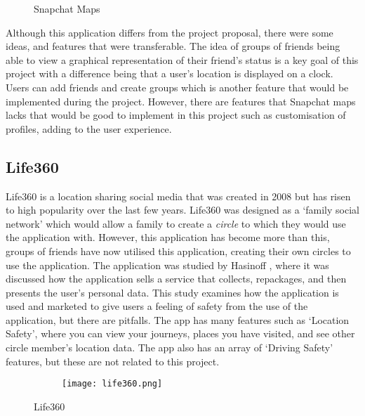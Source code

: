 \begin{figure}[!htbp]
    \centering
    \begin{subfigure}[b]{0.6\textwidth}
    \end{subfigure}
    \caption[Snapchat Maps]{Snapchat Maps \cite{snapMapImg}}
    \label{fig:snapMap}
\end{figure}
\FloatBarrier

Although this application differs from the project proposal, there were some ideas, and features that were transferable. The idea of groups of friends being able to view a graphical representation of their friend's status is a key goal of this project with a difference being that a user's location is displayed on a clock. Users can add friends and create groups which is another feature that would be implemented during the project. However, there are features that Snapchat maps lacks that would be good to implement in this project such as customisation of profiles, adding to the user experience.

\subsection{Life360}

Life360 is a location sharing social media that was created in 2008 but has risen to high popularity over the last few years. Life360 was designed as a `family social network' which would allow a family to create a \textit{circle} to which they would use the application with. However, this application has become more than this, groups of friends have now utilised this application, creating their own circles to use the application. The application was studied by Hasinoff \cite{life360}, where it was discussed how the application sells a service that collects, repackages, and then presents the user's personal data. This study examines how the application is used and marketed to give users a feeling of safety from the use of the application, but there are pitfalls. The app has many features such as `Location Safety', where you can view your journeys, places you have visited, and see other circle member's location data. The app also has an array of `Driving Safety' features, but these are not related to this project. 

\begin{figure}[!htbp]
    \centering
    \begin{subfigure}[b]{0.21\textwidth}
        {\texttt{[image: life360.png]}}
    \end{subfigure}
    \caption[Life360]{Life360 \cite{lifeLoc}}
    \label{fig:life360}
\end{figure}
\FloatBarrier


